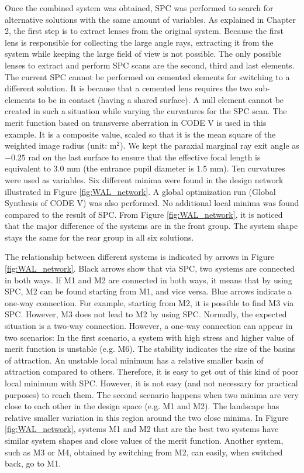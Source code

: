Once the combined system was obtained, SPC was performed to search for alternative solutions with the same amount of variables. As explained in Chapter 2, the first step is to extract lenses from the original system. Because the first lens is responsible for collecting the large angle rays, extracting it from the system while keeping the large field of view is not possible. The only possible lenses to extract and perform SPC scans are the second, third and last elements. The current SPC cannot be performed on cemented elements for switching to a different solution. It is because that a cemented lens requires the two sub-elements to be in contact (having a shared surface). A null element cannot be created in such a situation while varying the curvatures for the SPC scan. The merit function based on transverse aberration in CODE V is used in this example. It is a composite value, scaled so that it is the mean square of the weighted image radius (unit: \textmu m$^2$). We kept the paraxial marginal ray exit angle as $-0.25$ rad on the last surface to ensure that the effective focal length is equivalent to $3.0$ mm (the entrance pupil diameter is 1.5 mm). Ten curvatures were used as variables. Six different minima were found in the design network illustrated in Figure \ref{fig:WAL_network}. A global optimization run (Global Synthesis of CODE V) was also performed. No additional local minima was found compared to the result of SPC. From Figure \ref{fig:WAL_network}, it is noticed that the major difference of the systems are in the front group. The system shape stays the same for the rear group in all six solutions.

The relationship between different systems is indicated by arrows in Figure \ref{fig:WAL_network}. Black arrows show that via SPC, two systems are connected in both ways. If M1 and M2 are connected in both ways, it means that by using SPC, M2 can be found starting from M1, and vice versa. Blue arrows indicate a one-way connection. For example, starting from M2, it is possible to find M3 via SPC. However, M3 does not lead to M2 by using SPC. Normally, the expected situation is a two-way connection. However, a one-way connection can appear in two scenarios: In the first scenario, a system with high stress and higher value of merit function is unstable (e.g. M6). The stability indicates the size of the basins of attraction. An unstable local minimum has a relative smaller basin of attraction compared to others. Therefore, it is easy to get out of this kind of poor local minimum with SPC. However, it is not easy (and not necessary for practical purposes) to reach them. The second scenario happens when two minima are very close to each other in the design space (e.g. M1 and M2). The landscape has relative smaller variation in this region around the two close minima. In Figure \ref{fig:WAL_network}, systems M1 and M2 that are the best two systems have similar system shapes and close values of the merit function. Another system, such as M3 or M4, obtained by switching from M2, can easily, when switched back, go to M1. 

